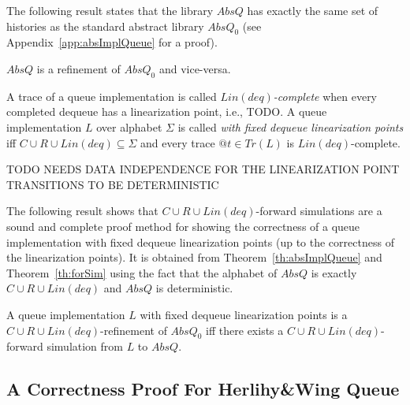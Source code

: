 The following result states that the library $AbsQ$ has exactly the same set of histories as the standard abstract library $AbsQ_0$ (see Appendix~\ref{app:absImplQueue} for a proof).

\begin{theorem}\label{th:absImplQueue}
$AbsQ$ is a refinement of $AbsQ_0$ and vice-versa.
\end{theorem}

A trace of a queue implementation is called \emph{$Lin(deq)$-complete} when every completed dequeue has a linearization point, i.e., TODO. A queue implementation $L$ over alphabet $\Sigma$ is called \emph{with fixed dequeue linearization points} if{f} $C\cup R\cup Lin(deq)\subseteq \Sigma$ 
and every trace $@t\in Tr(L)$ is $Lin(deq)$-complete.

TODO NEEDS DATA INDEPENDENCE FOR THE LINEARIZATION POINT TRANSITIONS TO BE DETERMINISTIC

The following result shows that $C\cup R\cup Lin(deq)$-forward simulations are a sound and complete proof method for showing the correctness of a queue implementation with fixed dequeue linearization points (up to the correctness of the linearization points). It is obtained from Theorem~\ref{th:absImplQueue} and Theorem~\ref{th:forSim} using the fact that the alphabet of $AbsQ$ is exactly $C\cup R\cup Lin(deq)$ and $AbsQ$ is deterministic.

\begin{corollary}
A queue implementation $L$ with fixed dequeue linearization points is a $C\cup R\cup Lin(deq)$-refinement of $AbsQ_0$ if{f} there exists a $C\cup R\cup Lin(deq)$-forward simulation from $L$ to $AbsQ$.
\end{corollary}

\subsection{A Correctness Proof For Herlihy\&Wing Queue}
